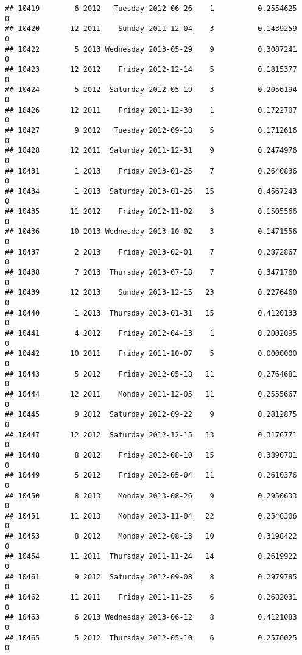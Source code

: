 \documentclass[
]{article}
\begin{document}
\begin{verbatim}
## 10419        6 2012   Tuesday 2012-06-26    1          0.2554625             0
## 10420       12 2011    Sunday 2011-12-04    3          0.1439259             0
## 10422        5 2013 Wednesday 2013-05-29    9          0.3087241             0
## 10423       12 2012    Friday 2012-12-14    5          0.1815377             0
## 10424        5 2012  Saturday 2012-05-19    3          0.2056194             0
## 10426       12 2011    Friday 2011-12-30    1          0.1722707             0
## 10427        9 2012   Tuesday 2012-09-18    5          0.1712616             0
## 10428       12 2011  Saturday 2011-12-31    9          0.2474976             0
## 10431        1 2013    Friday 2013-01-25    7          0.2640836             0
## 10434        1 2013  Saturday 2013-01-26   15          0.4567243             0
## 10435       11 2012    Friday 2012-11-02    3          0.1505566             0
## 10436       10 2013 Wednesday 2013-10-02    3          0.1471556             0
## 10437        2 2013    Friday 2013-02-01    7          0.2872867             0
## 10438        7 2013  Thursday 2013-07-18    7          0.3471760             0
## 10439       12 2013    Sunday 2013-12-15   23          0.2276460             0
## 10440        1 2013  Thursday 2013-01-31   15          0.4120133             0
## 10441        4 2012    Friday 2012-04-13    1          0.2002095             0
## 10442       10 2011    Friday 2011-10-07    5          0.0000000             0
## 10443        5 2012    Friday 2012-05-18   11          0.2764681             0
## 10444       12 2011    Monday 2011-12-05   11          0.2555667             0
## 10445        9 2012  Saturday 2012-09-22    9          0.2812875             0
## 10447       12 2012  Saturday 2012-12-15   13          0.3176771             0
## 10448        8 2012    Friday 2012-08-10   15          0.3890701             0
## 10449        5 2012    Friday 2012-05-04   11          0.2610376             0
## 10450        8 2013    Monday 2013-08-26    9          0.2950633             0
## 10451       11 2013    Monday 2013-11-04   22          0.2546306             0
## 10453        8 2012    Monday 2012-08-13   10          0.3198422             0
## 10454       11 2011  Thursday 2011-11-24   14          0.2619922             0
## 10461        9 2012  Saturday 2012-09-08    8          0.2979785             0
## 10462       11 2011    Friday 2011-11-25    6          0.2682031             0
## 10463        6 2013 Wednesday 2013-06-12    8          0.4121083             0
## 10465        5 2012  Thursday 2012-05-10    6          0.2576025             0

\end{verbatim}
\end{document}
